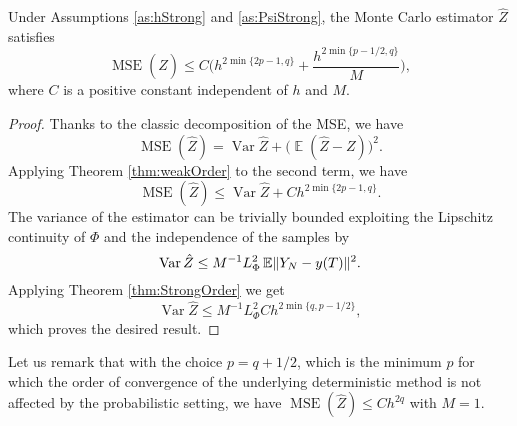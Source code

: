 \documentclass{siamart1116}
\numberwithin{theorem}{section}
\DeclarePairedDelimiter{\norm}{\|}{\|}
\newcommand{\Var}{\operatorname{Var}}
\newcommand{\E}{\operatorname{\mathbb{E}}}
\newcommand{\MSE}{\operatorname{MSE}}
\newcommand{\corr}[1]{{\color{bordeaux}#1}}
\begin{document}
\begin{theorem}\label{thm:MSEMonteCarlo} Under Assumptions \ref{as:hStrong} and \ref{as:PsiStrong}, the Monte Carlo estimator $\hat Z$ satisfies
	\corr{\begin{equation}\label{eq:MSEBound}
		\MSE(\hat Z) \leq C\Big(h^{2\min\{2p - 1, q\}} + \frac{h^{2\min\{p-1/2, q\}}}{M}\Big),
	\end{equation}}
	where $C$ is a positive constant independent of $h$ and $M$.
\end{theorem}
\begin{proof} Thanks to the classic decomposition of the MSE, we have
	\begin{equation}\label{eq:MSEDecomposition}
		\MSE(\hat Z) = \Var \hat Z  + \big(\E(\hat Z - Z)\big)^2.
	\end{equation}
	Applying Theorem \ref{thm:weakOrder} to the second term, we have
	\corr{\begin{equation}\label{eq:MSEWeakOrder}
		\MSE(\hat Z) \leq \Var \hat Z  + Ch^{2\min\{2p-1, q\}}.
	\end{equation}}
	The variance of the estimator can be trivially bounded exploiting the Lipschitz continuity of $\Phi$ and the independence of the samples by
	\begin{equation}\label{eq:MSELipschitz}
		\Var\hat Z \leq M^{-1} L_\Phi^2 \E \norm{Y_N - y(T)}^2.
	\end{equation}
	Applying Theorem \ref{thm:StrongOrder} we get
	\begin{equation}
		\Var\hat Z \leq M^{-1} L_\Phi^2 Ch^{2\min\{q, p-1/2\}},
	\end{equation}
	which proves the desired result.
\end{proof}
\corr{Let us remark that with the choice $p = q + 1/2$, which is the minimum $p$ for which the order of convergence of the underlying deterministic method is not affected by the probabilistic setting, we have $\MSE(\hat Z) \leq Ch^{2q}$ with $M = 1$.}
\end{document}
